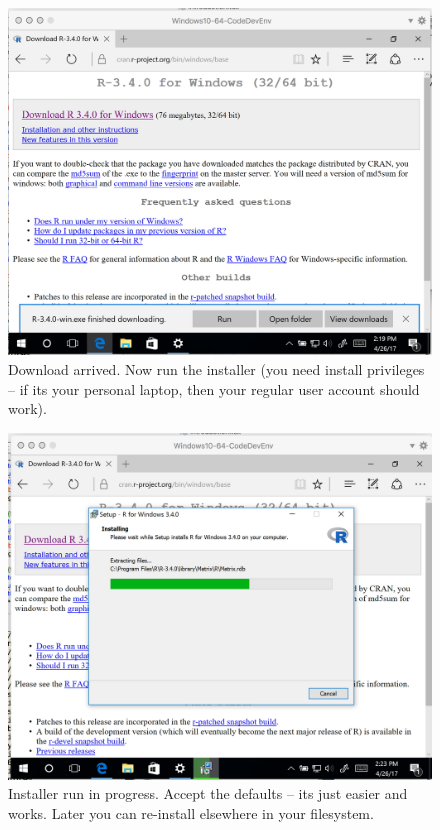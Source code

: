 \begin{figure}[h!] %
   \centering
   \includegraphics[width=4.5in]{./1-Introduction/repositoryR.jpg} 
   \caption{Download arrived.  Now run the installer (you need install privileges -- if its your personal laptop, then your regular user account should work). }
\end{figure}

\begin{figure}[h!] %
   \centering
   \includegraphics[width=4.5in]{./1-Introduction/chooseOS.jpg} 
   \caption{Installer run in progress.  Accept the defaults -- its just easier and works.   Later you can re-install elsewhere in your filesystem.}
\end{figure}

